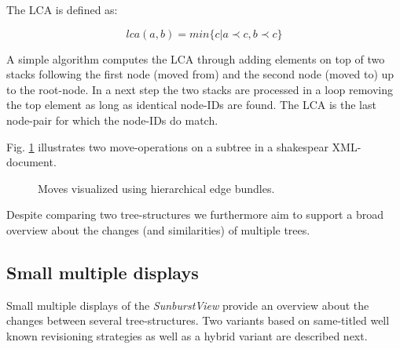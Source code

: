 The LCA is defined as:

\begin{equation}
lca(a{,} b) = min\{c|a \prec c, b \prec c\}
\end{equation}

A simple algorithm computes the LCA through adding elements on top of two stacks following the first node (moved from) and the second node (moved to) up to the root-node. In a next step the two stacks are processed in a loop removing the top element as long as identical node-IDs are found. The LCA is the last node-pair for which the node-IDs do match.

Fig. \ref{fig:moves} illustrates two move-operations on a subtree in a shakespear XML-document.

\begin{figure}[tb]
\caption{\label{fig:moves} Moves visualized using hierarchical edge bundles.}
\end{figure}

Despite comparing two tree-structures we furthermore aim to support a broad overview about the changes (and similarities) of multiple trees.

\subsection{Small multiple displays}\label{subsec::smallmultiple}
Small multiple displays of the \emph{SunburstView} provide an overview about the changes between several tree-structures. Two variants based on same-titled well known revisioning strategies as well as a hybrid variant are described next.

